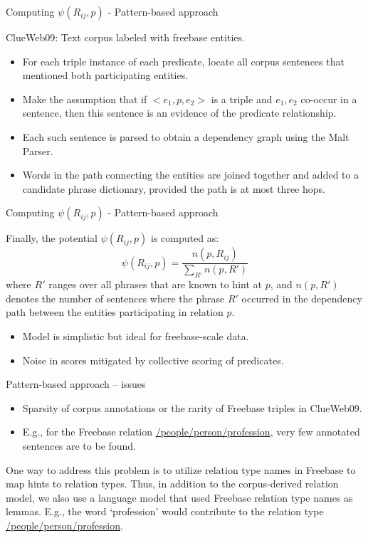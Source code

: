 \documentclass[pdf,11pt]{beamer}
\begin{document}
\begin{frame}{Computing $\psi(R_{ij},p)$ - Pattern-based approach}
\begin{block}{}
ClueWeb09: Text corpus labeled with freebase entities.
\end{block}

\begin{itemize}
\item For each triple instance of each predicate, locate all corpus sentences that mentioned both participating entities.
\item Make the assumption that if $<e_1, p, e_2>$ is a triple and $e_1, e_2$ co-occur in a sentence, then this sentence is an evidence of the predicate relationship.
\item Each such sentence is parsed to obtain a dependency graph using the Malt Parser.
\item Words in the path connecting the entities are joined together and added to a candidate phrase dictionary, provided the path is at most three hops.
\end{itemize}

\end{frame}

\begin{frame}{Computing $\psi(R_{ij},p)$ - Pattern-based approach}

Finally, the potential $\psi(R_{ij}, p)$ is computed as:
$$\psi(R_{ij},p) = \frac{n(p, R_{ij})}{\sum_{R'}{n(p, R')}}$$
where $R'$ ranges over all phrases that are known to
hint at $p$, and $n(p, R')$ denotes the number of sentences
where the phrase $R'$ occurred in the dependency
path between the entities participating in relation
$p$.

\begin{itemize}
\item Model is simplistic but ideal for freebase-scale data.
\item Noise in scores mitigated by collective scoring of predicates.
\end{itemize}
\end{frame}


\begin{frame}{Pattern-based approach -- issues}

\begin{itemize}
\item Sparsity of corpus annotations or the rarity of Freebase triples in ClueWeb09.
\item E.g., for the Freebase relation \url{/people/person/profession}, very few annotated sentences are to be found.

\end{itemize}
One way to address this problem is to utilize relation type names in Freebase to map hints to relation types. Thus, in addition to the corpus-derived relation
model, we also use a language model that used Freebase relation type names as lemmas. E.g., the word `profession' would contribute to the relation type \url{/people/person/profession}.

\end{frame}
\end{document}
